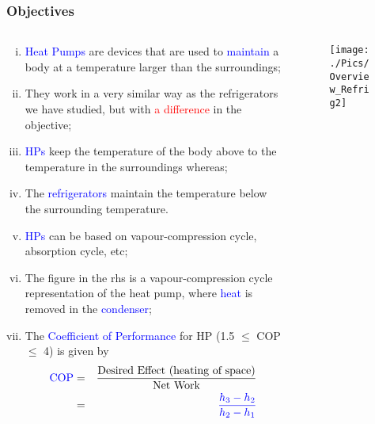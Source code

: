\documentclass[10pt,compress,handout,unknownkeysallowed]{beamer}
\begin{document}
\begin{frame}
 \frametitle{Objectives}
  \begin{columns}
   \begin{column}[c]{0.45\linewidth}
  \begin{enumerate}[(i)]\scriptsize
   \item <1-> \textcolor{blue}{Heat Pumps} are devices that are used to \textcolor{blue}{maintain} a body at a temperature larger than the surroundings;
   \item <2-> They work in a very similar way as the refrigerators we have studied, but with \textcolor{red}{a difference} in the objective;
   \item <3-> \textcolor{blue}{HPs} keep the temperature of the body above to the temperature in the surroundings whereas;
   \item <4-> The \textcolor{blue}{refrigerators} maintain the temperature below the surrounding temperature.
   \item <5-> \textcolor{blue}{HPs} can be based on vapour-compression cycle, absorption cycle, etc;
   \item <6-> The figure in the rhs is a vapour-compression cycle representation of the heat pump, where \textcolor{blue}{heat} is removed in the \textcolor{blue}{condenser};
   \item <7-> The \textcolor{blue}{Coefficient of Performance} for HP (1.5 $\le$ COP $\le$ 4) is given by
    \begin{eqnarray}
     \textcolor{blue}{\text{COP}} &=& \displaystyle\frac{\text{Desired Effect (heating of space)}}{\text{Net Work}} \nonumber \\
                                  &=& \textcolor{blue}{\displaystyle\frac{h_{3}-h_{2}}{h_{2}-h_{1}}}
    \end{eqnarray}
  \end{enumerate}
   \end{column}
   \begin{column}[c]{0.55\linewidth}
    \begin{figure}%
     \begin{center}
      \texttt{[image: ./Pics/Overview\_Refrig2]} \\
       \vspace{-.5cm}
     \end{center}
    \end{figure}  
   \end{column}  
  \end{columns}
\end{frame}
\end{document}
